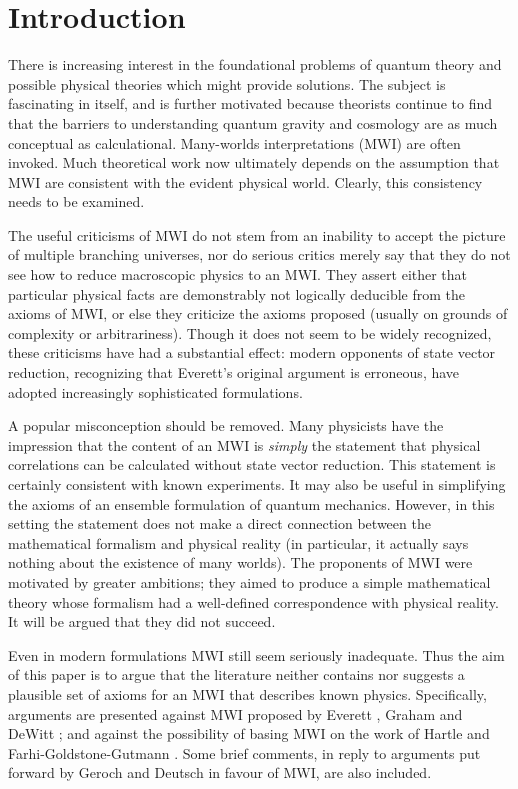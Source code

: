 \documentclass[aps,pra,12pt]{revtex4}
\begin{document}
\eject
\section{Introduction}

There is increasing interest in the foundational problems of quantum theory and
possible physical theories which might provide solutions.  
The subject is fascinating in itself, and is further motivated because
theorists continue to find that the barriers to understanding 
quantum gravity and cosmology are as much conceptual as calculational.  
Many-worlds interpretations (MWI) are often invoked.  Much theoretical work now
ultimately depends on the assumption that MWI are consistent with the
evident physical world.  Clearly, this consistency needs to be
examined.

The useful criticisms of MWI do not stem from an inability to accept
the picture of multiple branching universes, nor do serious critics
merely say that they do not see how to reduce macroscopic physics to
an MWI.  They assert either that particular physical facts are
demonstrably not logically deducible from the axioms of MWI, or else
they criticize the axioms proposed (usually on grounds of complexity
or arbitrariness).  Though it does not seem to be widely recognized,
these criticisms have had a substantial effect: modern opponents of
state vector reduction, recognizing that Everett's original argument
is erroneous, have adopted increasingly sophisticated formulations.

A popular misconception should be removed.  Many physicists have the
impression that the content of an MWI is {\em simply} the statement
that physical correlations can be calculated without state vector
reduction.  This statement is certainly consistent with known
experiments.  It may also be useful in simplifying the axioms of an
ensemble formulation of quantum mechanics.  
However, in this setting the statement does not
make a direct connection between the mathematical formalism and
physical reality (in particular, it actually says nothing about the
existence of many worlds).  The proponents of MWI were
motivated by greater ambitions; they aimed to produce a simple
mathematical theory whose formalism had a well-defined correspondence
with physical reality.  It will be argued that they did not succeed.

Even in modern formulations MWI still seem
seriously inadequate.
Thus the aim of this paper is to argue that the literature neither contains 
nor suggests a plausible set of axioms for an MWI that describes
known physics. 
Specifically, arguments are presented against
MWI proposed by Everett \cite{ev}, Graham \cite{gr} and
DeWitt \cite{dew}; and against the possibility of basing MWI on the
work of Hartle \cite{har} and Farhi-Goldstone-Gutmann \cite{fgg}. Some
brief comments, in reply to arguments put forward by Geroch \cite{ger}
and Deutsch \cite{deutsch} in favour of MWI, are also included.
\end{document}
